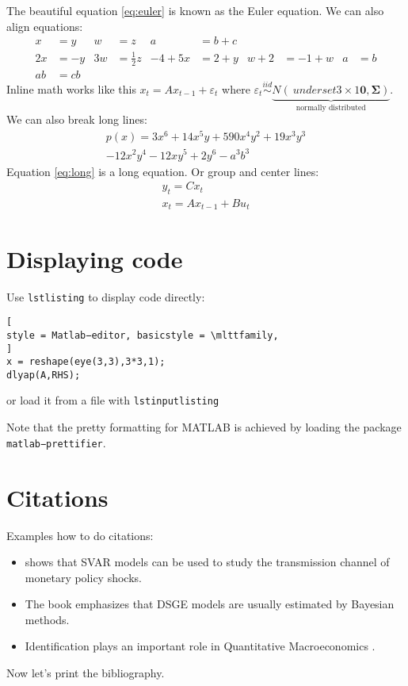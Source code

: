 \documentclass[a4paper]{scrartcl}
\begin{document}
The beautiful equation \eqref{eq:euler} is known as the Euler equation. We can also align equations:
\begin{align*}
x&=y & w &=z & a&=b+c\\
2x&=−y & 3w&=\frac{1}{2}z & −4 + 5x&=2+y & w+2&=−1+w &
a&=b\\
ab&=cb
\end{align*}
Inline math works like this $x_t=A x_{t−1}+ \varepsilon_t$ where $\varepsilon_t \overset{iid}\sim \underbrace{N(\
	underset{3 \times 1}{\boldsymbol{0}},\boldsymbol{\Sigma})}_{\text{normally distributed}}$.
We can also break long lines:
\begin{multline}
p(x) = 3x^6 + 14x^5y + 590x^4y^2 + 19x^3y^3
\\
− 12x^2y^4 − 12xy^5 + 2y^6 − a^3b^3 \label{eq:long}
\end{multline}
Equation \eqref{eq:long} is a long equation.
Or group and center lines:
\begin{gather*}
y_t = C x_{t}\\
x_t = A x_{t−1} + Bu_t
\end{gather*}

\section{Displaying code}
Use \texttt{lstlisting} to display code directly:
\begin{lstlisting}[
style = Matlab−editor, basicstyle = \mlttfamily,
]
x = reshape(eye(3,3),3*3,1);
dlyap(A,RHS);
\end{lstlisting}
or load it from a file with \texttt{lstinputlisting}

Note that the pretty formatting for MATLAB is achieved by loading the package \texttt{matlab−prettifier}.

\section{Citations}\label{sec:citations}
Examples how to do citations:
\begin{itemize}
	\item \textcite{Sims_1980_MacroeconomicsReality} shows that SVAR models can be used to study the transmission
		channel of monetary policy shocks.
	\item The book \textcite{Herbst.Schorfheide_2016_BayesianEstimationDSGE} emphasizes that DSGE models are usually
		estimated by Bayesian methods.
	\item Identification plays an important role in Quantitative Macroeconomics \parencite{Kilian_2013_
		StructuralVectorAutoregressions,Mutschler_2022_QuantitativeMacroeconomics}.
\end{itemize}
Now let’s print the bibliography.
\printbibliography
\end{document}
